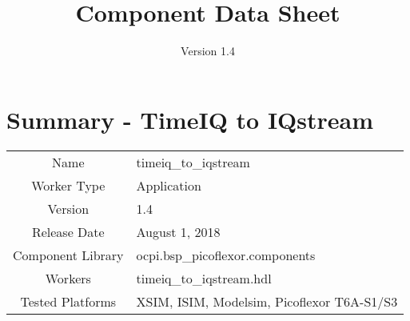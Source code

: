 \iffalse
This file is protected by Copyright. Please refer to the COPYRIGHT file
distributed with this source distribution.

This file is part of OpenCPI <http://www.opencpi.org>

OpenCPI is free software: you can redistribute it and/or modify it under the
terms of the GNU Lesser General Public License as published by the Free Software
Foundation, either version 3 of the License, or (at your option) any later
version.

OpenCPI is distributed in the hope that it will be useful, but WITHOUT ANY
WARRANTY; without even the implied warranty of MERCHANTABILITY or FITNESS FOR A
PARTICULAR PURPOSE. See the GNU Lesser General Public License for more details.

You should have received a copy of the GNU Lesser General Public License along
with this program. If not, see <http://www.gnu.org/licenses/>.
\fi

\def\docTitle{Component Data Sheet}
\def\docVersion{1.4}

\date{Version \docVersion} %
\title{\docTitle}
\lhead{\small{\docTitle}}

\usepackage{longtable} %

\def\comp{timeiq\_to\_iqstream}
\def\ecomp{timeiq_to_iqstream}
\def\Comp{TimeIQ to IQstream}
\graphicspath{ {figures/} }



\section*{Summary - \Comp}
\begin{tabular}{|c|M{13.5cm}|}
	\hline
	                  &                        							\\
	\hline
	Name              & \comp                  							\\
	\hline
	Worker Type       & Application            							\\
	\hline
	Version           & 1.4                  							\\
	\hline
	Release Date      & August 1, 2018           						\\
	\hline
	Component Library & ocpi.bsp\_picoflexor.components					\\
	\hline
	Workers           & \comp.hdl              							\\
	\hline
	Tested Platforms  & XSIM, ISIM, Modelsim, Picoflexor T6A-S1/S3		\\
	\hline
\end{tabular}
	
